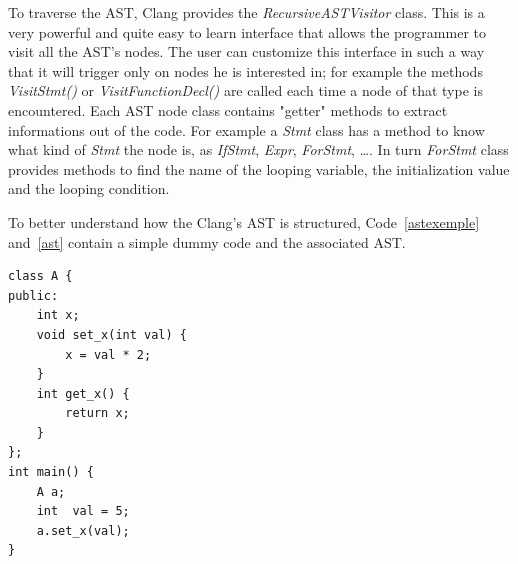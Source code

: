 \documentclass[a4paper,12pt,oneside]{book}
\begin{document}
To traverse the AST, Clang provides the \emph{RecursiveASTVisitor} class. This is a very powerful and quite easy to learn interface that allows the programmer to visit all the AST’s nodes. The user can customize this interface in such a way that it will trigger only on nodes he is interested in; for example the methods \emph{VisitStmt()} or \emph{VisitFunctionDecl()} are called each time a node of that type is encountered. Each AST node class contains "getter" methods to extract informations out of the code. For example a \emph{Stmt} class has a method to know what kind of \emph{Stmt} the node is, as \emph{IfStmt}, \emph{Expr}, \emph{ForStmt}, \dots. In turn \emph{ForStmt} class provides methods to find the name of the looping variable, the initialization value and the looping condition.

To better understand how the Clang’s AST is structured, Code~\ref{astexemple} and~\ref{ast} contain a simple dummy code and the associated AST.
\newline
\begin{lstlisting}[language=CCC, caption=Simple code., label=astexemple]
class A {
public:
	int x;
	void set_x(int val) {
		x = val * 2;
	}	
	int get_x() {
		return x;
	}
};
int main() {
	A a;
	int  val = 5;
	a.set_x(val);
}
\end{lstlisting}
\end{document}
